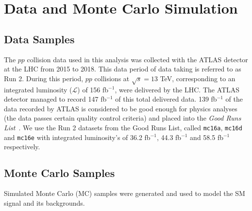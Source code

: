 
\section{Data and Monte Carlo Simulation}
\subsection{Data Samples}
The $pp$ collision data used in this analysis was collected with the ATLAS detector at the LHC from 2015 to 2018. This data period of data taking is referred to as Run 2. During this period, $pp$ collisions at $\sqrt{s}=13$ TeV, corresponding to an integrated luminosity ($\mathcal{L}$) of 156 fb$^{-1}$, were delivered by the LHC. The ATLAS detector managed to record 147 fb$^{-1}$ of this total delivered data. 139 fb$^{-1}$ of the data recorded by ATLAS is considered to be good enough for physics analyses (the data passes certain quality control criteria) and placed into the \textit{Good Runs List}~\cite{GoodRunLists}. We use the Run 2 datasets from the Good Runs List, called \texttt{mc16a}, \texttt{mc16d} and \texttt{mc16e} with integrated luminosity's of 36.2 fb$^{-1}$, 44.3 fb$^{-1}$ and 58.5 fb$^{-1}$ respectively.



\subsection{Monte Carlo Samples}
\label{sec:mcsamples}

Simulated Monte Carlo (MC) samples were generated and used to model the SM \tWZ signal and its backgrounds.\\\\

